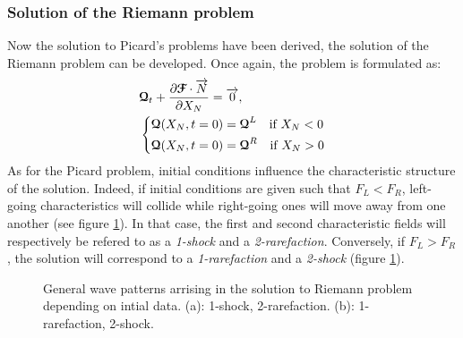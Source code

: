 \subsubsection*{Solution of the Riemann problem}
Now the solution to Picard's problems have been derived, the solution of the Riemann problem can be developed. Once again, the problem is formulated as:
\begin{equation}
  \begin{aligned}
    &{\boldsymbol{\mathcal{Q}}}_t + \frac{\partial {\boldsymbol{\mathcal{F}}}\cdot {\overrightarrow{N}}}{\partial X_N} = {\overrightarrow{0}}, \\
    &\left\lbrace 
      \begin{aligned}
        & {\boldsymbol{\mathcal{Q}}}(X_N,t=0) = {\boldsymbol{\mathcal{Q}}}^L \quad \text{if } X_N< 0\\
        & {\boldsymbol{\mathcal{Q}}}(X_N,t=0) = {\boldsymbol{\mathcal{Q}}}^R \quad \text{if } X_N> 0
      \end{aligned}
    \right.
  \end{aligned}
\end{equation}
As for the Picard problem, initial conditions influence the characteristic structure of the solution. Indeed, if initial conditions are given such that $F_L<F_R$, left-going characteristics will collide while right-going ones will move away from one another (see figure \ref{fig:RP_solution}). In that case, the first and second characteristic fields will respectively be refered to as a \textit{1-shock} and a \textit{2-rarefaction}. Conversely, if $F_L>F_R$, the solution will correspond to a \textit{1-rarefaction} and a \textit{2-shock} (figure \ref{fig:RP_solution}). 

\begin{figure}[h]
  \centering
  \caption{General wave patterns arrising in the solution to Riemann problem depending on intial data. (a): 1-shock, 2-rarefaction. (b): 1-rarefaction, 2-shock.}
  \label{fig:RP_solution}
\end{figure}

